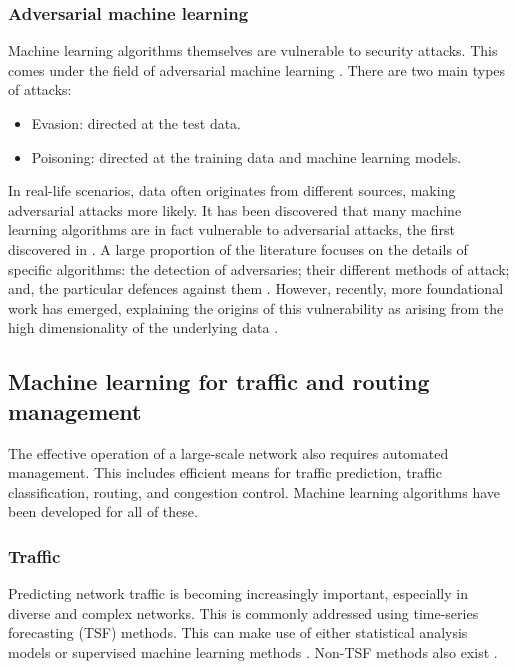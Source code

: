 \documentclass[twocolumn, aps, rmp, amsmath, amssymb, nofootinbib, superscriptaddress, longbibliography, floatfix, table-of-contents, eqsecnum]{revtex4}
\begin{document}
\subsubsection{Adversarial machine learning} 

Machine learning algorithms themselves are vulnerable to security attacks. This comes under the field of adversarial machine learning \cite{bib:huang2011adversarial}. There are two main types of attacks:
\begin{itemize}
\item Evasion: directed at the test data.
\item Poisoning: directed at the training data and machine learning models.
\end{itemize}
In real-life scenarios, data often originates from different sources, making adversarial attacks more likely. It has been discovered that many machine learning algorithms are in fact vulnerable to adversarial attacks, the first discovered in \cite{bib:szegedy2013intriguing}. A large proportion of the literature focuses on the details of specific algorithms: the detection of adversaries; their different methods of attack; and, the particular defences against them \cite{bib:kurakin2018adversarial}. However, recently, more foundational work has emerged, explaining the origins of this vulnerability as arising from the high dimensionality of the underlying data \cite{bib:goodfellow2014explaining, bib:gilmer2018adversarial, bib:mahloujifar2018curse}.

\subsection{Machine learning for traffic and routing management}

The effective operation of a large-scale network also requires automated management. This includes efficient means for traffic prediction, traffic classification, routing, and congestion control. Machine learning algorithms have been developed for all of these.

\subsubsection{Traffic}

Predicting network traffic is becoming increasingly important, especially in diverse and complex networks. This is commonly addressed using time-series forecasting (TSF) methods. This can make use of either statistical analysis models or supervised machine learning methods \cite{bib:bermolen2009support, bib:chabaa2010identification, bib:cortez2006internet}. Non-TSF methods also exist \cite{bib:chen2016predicting, bib:li2016inter}.
\end{document}
